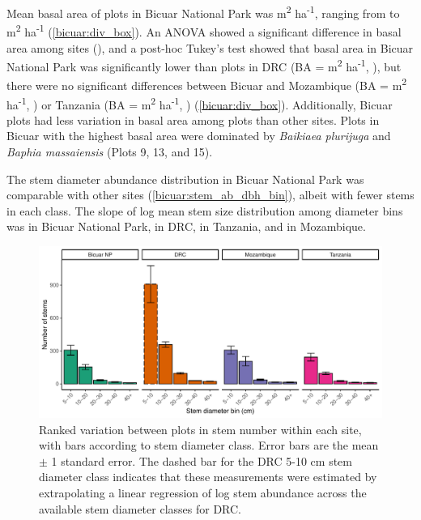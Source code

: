 \begin{refsection}
Mean basal area of plots in Bicuar National Park was \babicuar{} m\textsuperscript{2} ha\textsuperscript{-1}, ranging from \bicuarbamin{} to \bicuarbamax{} m\textsuperscript{2} ha\textsuperscript{-1} (\autoref{bicuar:div_box}). An ANOVA showed a significant difference in basal area among sites (\lmba{}), and a post-hoc Tukey's test showed that basal area in Bicuar National Park was significantly lower than plots in DRC (BA = \badrc{} m\textsuperscript{2} ha\textsuperscript{-1}, \tukeybabicuardrc{}), but there were no significant differences between Bicuar and Mozambique (BA = \banham{} m\textsuperscript{2} ha\textsuperscript{-1}, \tukeybabicuarnham{}) or Tanzania (BA = \bakilwa{} m\textsuperscript{2} ha\textsuperscript{-1}, \tukeybabicuarkilwa{}) (\autoref{bicuar:div_box}). Additionally, Bicuar plots had less variation in basal area among plots than other sites. Plots in Bicuar with the highest basal area were dominated by \textit{Baikiaea plurijuga} and \textit{Baphia massaiensis} (Plots 9, 13, and 15). 

The stem diameter abundance distribution in Bicuar National Park was comparable with other sites (\autoref{bicuar:stem_ab_dbh_bin}), albeit with fewer stems in each class. The slope of log mean stem size distribution among diameter bins was \dbhslopebicuar{} in Bicuar National Park, \dbhslopedrc{} in DRC, \dbhslopekilwa{} in Tanzania, and \dbhslopenham{} in Mozambique.  

\begin{figure}[!h]
\centering
	\includegraphics[width=\textwidth]{img/stem_ab_dbh_bin_group}
	\caption[Bar plots of stem diameter abundance within each site]{Ranked variation between plots in stem number within each site, with bars according to stem diameter class. Error bars are the mean $\pm$ 1 standard error. The dashed bar for the DRC 5-10 cm stem diameter class indicates that these measurements were estimated by extrapolating a linear regression of log stem abundance across the available stem diameter classes for DRC.}
	\label{bicuar:stem_ab_dbh_bin}
\end{figure}


\end{refsection}
